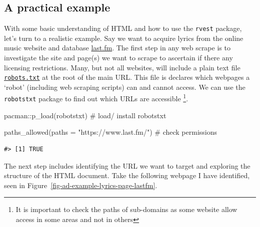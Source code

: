 \documentclass[
  letterpaper,
]{latex/krantz}
\newenvironment{Shaded}{\begin{snugshade}}{\end{snugshade}}
\newcommand{\AttributeTok}[1]{\textcolor[rgb]{0.40,0.45,0.13}{#1}}
\newcommand{\CommentTok}[1]{\textcolor[rgb]{0.37,0.37,0.37}{#1}}
\newcommand{\FunctionTok}[1]{\textcolor[rgb]{0.28,0.35,0.67}{#1}}
\newcommand{\NormalTok}[1]{\textcolor[rgb]{0.00,0.23,0.31}{#1}}
\newcommand{\SpecialCharTok}[1]{\textcolor[rgb]{0.37,0.37,0.37}{#1}}
\newcommand{\StringTok}[1]{\textcolor[rgb]{0.13,0.47,0.30}{#1}}
\begin{document}
\hypertarget{a-practical-example}{%
\subsection{A practical example}\label{a-practical-example}}

With some basic understanding of HTML and how to use the \texttt{rvest}
package, let's turn to a realistic example. Say we want to acquire
lyrics from the online music website and database
\href{https://www.last.fm/}{last.fm}. The first step in any web scrape
is to investigate the site and page(s) we want to scrape to ascertain if
there any licensing restrictions. Many, but not all websites, will
include a plain text file
\href{https://www.cloudflare.com/learning/bots/what-is-robots.txt/}{\texttt{robots.txt}}
at the root of the main URL. This file is declares which webpages a
`robot' (including web scraping scripts) can and cannot access. We can
use the \texttt{robotstxt} package to find out which URLs are accessible
\footnote{It is important to check the paths of sub-domains as some
  website allow access in some areas and not in others}.

\begin{Shaded}
\begin{Highlighting}[]
\NormalTok{pacman}\SpecialCharTok{::}\FunctionTok{p\_load}\NormalTok{(robotstxt) }\CommentTok{\# load/ install \textasciigrave{}robotstxt\textasciigrave{}}

\FunctionTok{paths\_allowed}\NormalTok{(}\AttributeTok{paths =} \StringTok{"https://www.last.fm/"}\NormalTok{) }\CommentTok{\# check permissions}
\end{Highlighting}
\end{Shaded}

\begin{verbatim}
#> [1] TRUE
\end{verbatim}

The next step includes identifying the URL we want to target and
exploring the structure of the HTML document. Take the following webpage
I have identified, seen in
Figure~\ref{fig-ad-example-lyrics-page-lastfm}.
\end{document}
